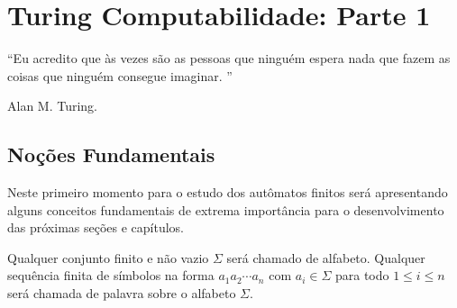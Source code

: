 \chapter{Turing Computabilidade: Parte 1}\label{cap:LLivresContexto}


\epigraph{``Eu acredito que às vezes são as pessoas que ninguém espera nada que fazem as coisas que ninguém consegue imaginar. ''}{Alan M. Turing.}

 
\section{Noções Fundamentais}
 
Neste primeiro momento para o estudo dos autômatos finitos será apresentando alguns conceitos fundamentais de extrema importância para o desenvolvimento das próximas seções e capítulos.

\begin{definition}
	\cite{valdi2016master} Qualquer conjunto finito e não vazio $\Sigma$ será chamado de alfabeto. Qualquer sequência finita de símbolos na forma $a_1a_2\cdots a_n$ com $a_i \in \Sigma$ para todo $1 \leq i \leq n$ será chamada de palavra sobre o alfabeto $\Sigma$.
\end{definition}
